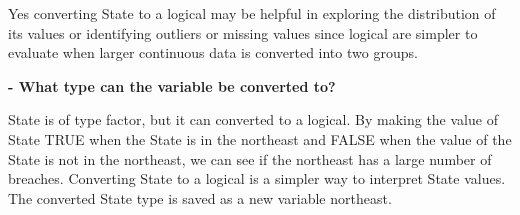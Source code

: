 \documentclass[
]{article}
\newenvironment{Shaded}{\begin{snugshade}}{\end{snugshade}}
\newcommand{\CommentTok}[1]{\textcolor[rgb]{0.56,0.35,0.01}{\textit{#1}}}
\newcommand{\ConstantTok}[1]{\textcolor[rgb]{0.00,0.00,0.00}{#1}}
\newcommand{\ControlFlowTok}[1]{\textcolor[rgb]{0.13,0.29,0.53}{\textbf{#1}}}
\newcommand{\FunctionTok}[1]{\textcolor[rgb]{0.00,0.00,0.00}{#1}}
\newcommand{\NormalTok}[1]{#1}
\newcommand{\OtherTok}[1]{\textcolor[rgb]{0.56,0.35,0.01}{#1}}
\newcommand{\SpecialCharTok}[1]{\textcolor[rgb]{0.00,0.00,0.00}{#1}}
\newcommand{\StringTok}[1]{\textcolor[rgb]{0.31,0.60,0.02}{#1}}
\begin{document}
Yes converting State to a logical may be helpful in exploring the
distribution of its values or identifying outliers or missing values
since logical are simpler to evaluate when larger continuous data is
converted into two groups.

\textbf{- What type can the variable be converted to?}

State is of type factor, but it can converted to a logical. By making
the value of State TRUE when the State is in the northeast and FALSE
when the value of the State is not in the northeast, we can see if the
northeast has a large number of breaches. Converting State to a logical
is a simpler way to interpret State values. The converted State type is
saved as a new variable northeast.

\begin{Shaded}
\end{Shaded}
\end{document}
